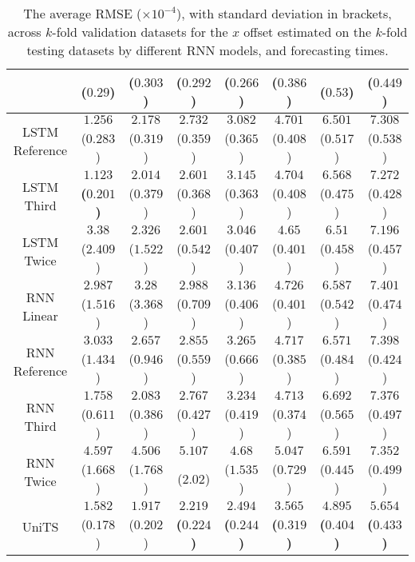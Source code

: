\begin{table}[!ht]
{\begin{tabular}{|c|c|c|c|c|c|c|c|}
			 & ($0.29$) & ($0.303$) & ($0.292$) & ($0.266$) & ($0.386$) & ($0.53$) & ($0.449$) \\ \hline
			\multirow{2}{*}{LSTM Reference} & $1.256$ & $2.178$ & $2.732$ & $3.082$ & $4.701$ & $6.501$ & $7.308$ \\
			 & ($0.283$) & ($0.319$) & ($0.359$) & ($0.365$) & ($0.408$) & ($0.517$) & ($0.538$) \\ \hline
			\multirow{2}{*}{LSTM Third} & $\mathbf{1.123}$ & $2.014$ & $2.601$ & $3.145$ & $4.704$ & $6.568$ & $7.272$ \\
			 & \textbf{(}$\mathbf{0.201}$\textbf{)} & ($0.379$) & ($0.368$) & ($0.363$) & ($0.408$) & ($0.475$) & ($0.428$) \\ \hline
			\multirow{2}{*}{LSTM Twice} & $3.38$ & $2.326$ & $2.601$ & $3.046$ & $4.65$ & $6.51$ & $7.196$ \\
			 & ($2.409$) & ($1.522$) & ($0.542$) & ($0.407$) & ($0.401$) & ($0.458$) & ($0.457$) \\ \hline
			\multirow{2}{*}{RNN Linear} & $2.987$ & $3.28$ & $2.988$ & $3.136$ & $4.726$ & $6.587$ & $7.401$ \\
			 & ($1.516$) & ($3.368$) & ($0.709$) & ($0.406$) & ($0.401$) & ($0.542$) & ($0.474$) \\ \hline
			\multirow{2}{*}{RNN Reference} & $3.033$ & $2.657$ & $2.855$ & $3.265$ & $4.717$ & $6.571$ & $7.398$ \\
			 & ($1.434$) & ($0.946$) & ($0.559$) & ($0.666$) & ($0.385$) & ($0.484$) & ($0.424$) \\ \hline
			\multirow{2}{*}{RNN Third} & $1.758$ & $2.083$ & $2.767$ & $3.234$ & $4.713$ & $6.692$ & $7.376$ \\
			 & ($0.611$) & ($0.386$) & ($0.427$) & ($0.419$) & ($0.374$) & ($0.565$) & ($0.497$) \\ \hline
			\multirow{2}{*}{RNN Twice} & $4.597$ & $4.506$ & $5.107$ & $4.68$ & $5.047$ & $6.591$ & $7.352$ \\
			 & ($1.668$) & ($1.768$) & ($2.02$) & ($1.535$) & ($0.729$) & ($0.445$) & ($0.499$) \\ \hline
			\multirow{2}{*}{UniTS} & $1.582$ & $1.917$ & $\mathbf{2.219}$ & $\mathbf{2.494}$ & $\mathbf{3.565}$ & $\mathbf{4.895}$ & $\mathbf{5.654}$ \\
			 & ($0.178$) & ($0.202$) & \textbf{(}$\mathbf{0.224}$\textbf{)} & \textbf{(}$\mathbf{0.244}$\textbf{)} & \textbf{(}$\mathbf{0.319}$\textbf{)} & \textbf{(}$\mathbf{0.404}$\textbf{)} & \textbf{(}$\mathbf{0.433}$\textbf{)} \\ \hline
		\end{tabular}
	}
	\caption{The average RMSE ($\times 10^{-4}$), with standard deviation in brackets, across $k$-fold validation datasets for the $x$ offset estimated on the $k$-fold testing datasets by different RNN models, and forecasting times.}
	\label{tab:all_longitude_no_abs_RMSE}
\end{table}